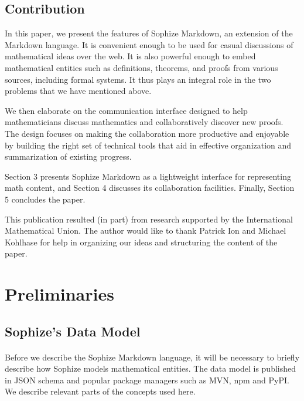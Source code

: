 \documentclass[]{ceurart}
\begin{document}
\subsection*{Contribution}

In this paper, we present the features of Sophize Markdown, an extension of the Markdown language. It is convenient enough to be used for casual discussions of mathematical ideas over the web. It is also powerful enough to embed mathematical entities such as definitions, theorems, and proofs from various sources, including formal systems. It thus plays an integral role in the two problems that we have mentioned above.

We then elaborate on the communication interface designed to help mathematicians discuss mathematics and collaboratively discover new proofs. The design focuses on making the collaboration more productive and enjoyable by building the right set of technical tools that aid in effective organization and summarization of existing progress.

Section 3 presents Sophize Markdown as a lightweight interface for representing math content, and Section 4 discusses its collaboration facilities. Finally, Section 5 concludes the paper.

\begin{acknowledgments}
This publication resulted (in part) from research supported by the International Mathematical Union. The author would like to thank Patrick Ion and Michael Kohlhase for help in organizing our ideas and structuring the content of the paper.
\end{acknowledgments}


\section{Preliminaries}

\subsection{Sophize's Data Model}
\paragraph{}Before we describe the Sophize Markdown language, it will be necessary to briefly describe how Sophize models mathematical entities. The data model is published in JSON schema \cite{sophize_datamodel} and popular package managers such as MVN, npm and PyPI. We describe relevant parts of the concepts used here.
\end{document}
